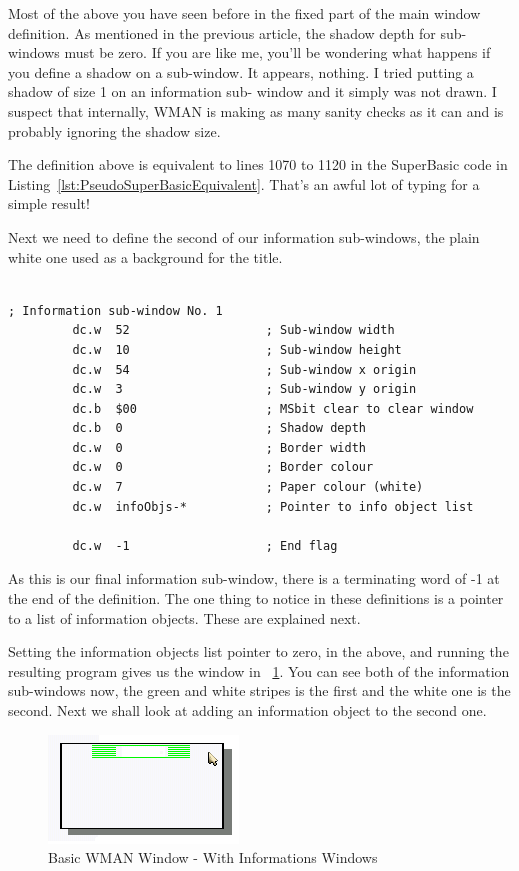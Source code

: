 Most of the above you have seen before in the fixed part of the main window
definition. As mentioned in the previous article, the shadow depth for sub-{}windows must be
zero. If you are like me, you'll be wondering what happens if you define a shadow on a
sub-{}window. It appears, nothing. I tried putting a shadow of size 1 on an information sub-{}
window and it simply was not drawn. I suspect that internally, WMAN is making as many
sanity checks as it can and is probably ignoring the shadow size.

The definition above is equivalent to lines 1070 to 1120 in the SuperBasic code
in Listing~\ref{lst:PseudoSuperBasicEquivalent}. That's an awful lot of typing for a simple result!

Next we need to define the second of our information sub-{}windows, the plain white
one used as a background for the title.

\begin{lstlisting}[firstnumber=last,caption={WMAN Example Window - Information Window 1}]

; Information sub-window No. 1
         dc.w  52                   ; Sub-window width
         dc.w  10                   ; Sub-window height
         dc.w  54                   ; Sub-window x origin
         dc.w  3                    ; Sub-window y origin
         dc.b  $00                  ; MSbit clear to clear window
         dc.b  0                    ; Shadow depth
         dc.w  0                    ; Border width 
         dc.w  0                    ; Border colour
         dc.w  7                    ; Paper colour (white)
         dc.w  infoObjs-*           ; Pointer to info object list

         dc.w  -1                   ; End flag
\end{lstlisting}

As this is our final information sub-window, there is a terminating word of -{}1 at the end of the
definition. The one thing to notice in these definitions is a pointer to a list of
information objects. These are explained next.

Setting the information objects list pointer to zero, in the above, and running the resulting
program gives us the window in \figurename~\ref{fig:FirstWindowInAction2}. You can see both of the information sub-{}windows
now, the green and white stripes is the first and the white one is the second. Next we
shall look at adding an information object to the second one.

\begin{figure}[h]
\center
\includegraphics{Content/images/SystemInfo_2.png}
\caption{Basic WMAN Window - With Informations Windows}
\label{fig:FirstWindowInAction2}
\end{figure}


